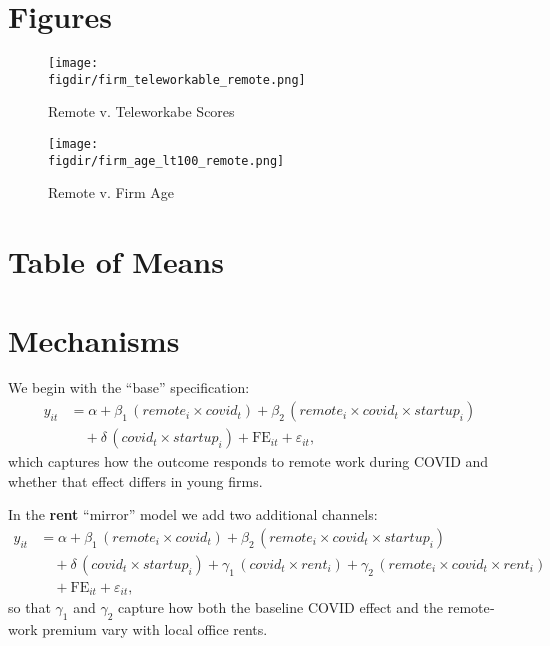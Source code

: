 \documentclass{article}
\newcommand{\cleanedresultsdir}{../results/cleaned}
\newcommand{\figdir}{../results/figures}
\begin{document}
\section{Figures}

\begin{figure}[H]
  \centering
  \texttt{[image: \\figdir/firm\_teleworkable\_remote.png]}
  \caption{Remote v. Teleworkabe Scores}
\end{figure}

\begin{figure}[H]
  \centering
  \texttt{[image: \\figdir/firm\_age\_lt100\_remote.png]}
  \caption{Remote v. Firm Age}
\end{figure}


\section{Table of Means}


\section{Mechanisms}

We begin with the “base” specification:
\[
\begin{aligned}
y_{it} &= \alpha 
  + \beta_1\,(remote_i \times covid_t)
  + \beta_2\,(remote_i \times covid_t \times startup_i) \\
       &\quad
  + \delta\,(covid_t \times startup_i)
  + \mathrm{FE}_{it}
  + \varepsilon_{it},
\end{aligned}
\]
which captures how the outcome responds to remote work during COVID and
whether that effect differs in young firms.

In the \textbf{rent} “mirror” model we add two additional channels:
\[
\begin{aligned}
y_{it} &= \alpha 
  + \beta_1\,(remote_i \times covid_t)
  + \beta_2\,(remote_i \times covid_t \times startup_i) \\
       &\quad
  + \delta\,(covid_t \times startup_i)
  + \gamma_1\,(covid_t \times rent_i)
  + \gamma_2\,(remote_i \times covid_t \times rent_i) \\
       &\quad
  + \mathrm{FE}_{it}
  + \varepsilon_{it},
\end{aligned}
\]
so that \(\gamma_1\) and \(\gamma_2\) capture how both the baseline COVID
effect and the remote‐work premium vary with local office rents.
\end{document}
